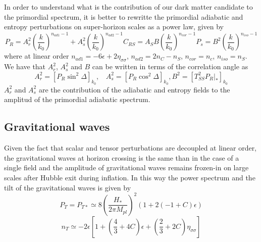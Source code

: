 \documentclass[twocolumn,           %
               showpacs,            %
               preprintnumbers,     %
               aps,                 %
               prl,          	    %
               letterpaper,             %
               superscriptaddress,      %
               nofootinbib,         %
               tightenlines,        %
               floats,floatfix      %
               ,usenatbib,
               ]{revtex4-1}
\begin{document}
In order to understand what is the contribution of our dark matter candidate to the primordial spectrum, it is better to rewritte the primordial adiabatic and entropy perturbations on super-horizon scales as a power law, given by
\begin{subequations}\label{PswAs}
\begin{equation}\label{PrAs}
P_R=A_r^2\left(\frac{k}{k_0}\right)^{n_{ad1}-1}+A_s^2\left(\frac{k}{k_0}\right)^{n_{ad2}-1}
\end{equation}
\begin{equation}\label{PrCrs}
C_{RS}=A_SB\left(\frac{k}{k_0}\right)^{n_{cor}-1}
\end{equation}
\begin{equation}\label{PsAs}
P_s=B^2\left(\frac{k}{k_0}\right)^{n_{iso}-1}
\end{equation}
\end{subequations}
where at linear order $n_{ad1}=-6\epsilon+2\eta_{\sigma\sigma}$, $n_{ad2}=2n_C-n_S$, $n_{cor}=n_c$, $n_{iso}=n_S$. We have that $A_r^2$, $A_s^2$ and $B$ can be written in terms of the correlation angle as
\begin{subequations}
\label{RelAs}
\begin{equation}
A_r^2=[P_R\sin^2\Delta]_{k_0}, \ \ \ \ A_s^2=[P_R\cos^2\Delta]_{k_0},
\end{equation}
\begin{equation}
B^2=[T_{SS}^2 P_R|_*]_{k_0}
\end{equation}
\end{subequations}
$A_r^2$ and $A_s^2$ are the contribution of the adiabatic and entropy fields to the amplitud of the primordial adiabatic spectrum. 
\subsection{Gravitational waves}

Given the fact that scalar and tensor perturbations are decoupled at linear order, the gravitational waves at horizon crossing is the same than in the case of a single field and the amplitude of gravitational waves remains frozen-in on large scales after Hubble exit during inflation. In this way the power spectrum and the tilt of the gravitational waves is given by
\begin{equation}
P_T=P_{T*}\simeq 8 \left(\frac{H_*}{2\pi M_{pl}}\right)^2(1+2(-1+C)\epsilon)
\end{equation}
\begin{equation}\label{tiltsnt}
n_T\simeq -2\epsilon\left[1+\left(\frac{4}{3}+4C\right)\epsilon+\left(\frac{2}{3}+2C\right)\eta_{\sigma\sigma}\right]
\end{equation}
\end{document}
